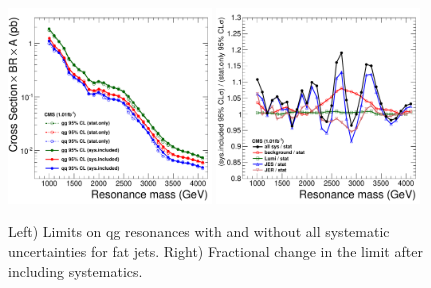 \begin{figure}[!ht]
  \begin{center}
     \includegraphics[width=0.48\textwidth]{Figures/c_xs_all_fat.pdf}
    \includegraphics[width=0.48\textwidth]{Figures/c_xs_comparison_bw_stat_sys_fat.pdf}
    \caption{Left) Limits on qg resonances with and without all systematic uncertainties for fat jets. 
    Right) Fractional change in the limit after including systematics.}
    \label{limit_change_fat}
  \end{center}
\end{figure}

